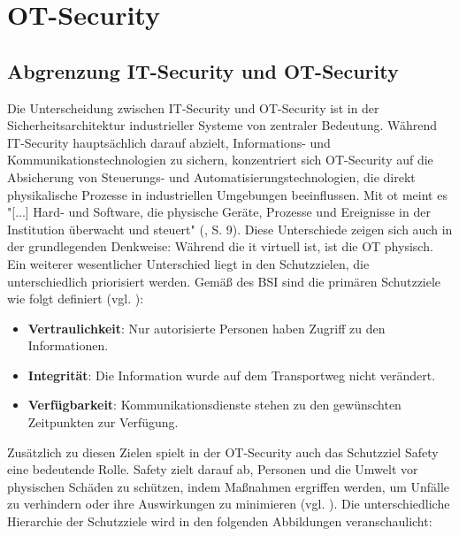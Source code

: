 \section{OT-Security}

\subsection{Abgrenzung IT-Security und OT-Security}

Die Unterscheidung zwischen IT-Security und OT-Security ist in der Sicherheitsarchitektur industrieller Systeme von zentraler Bedeutung. Während IT-Security hauptsächlich darauf abzielt, Informations- und Kommunikationstechnologien zu sichern, konzentriert sich OT-Security auf die Absicherung von Steuerungs- und Automatisierungstechnologien, die direkt physikalische Prozesse in industriellen Umgebungen beeinflussen. Mit \ac{ot} meint es "[...] Hard- und Software, die physische Geräte, Prozesse und Ereignisse in der Institution überwacht und steuert" (\cite {ICS}, S. 9). Diese Unterschiede zeigen sich auch in der grundlegenden Denkweise: Während die \ac{it} virtuell ist, ist die OT physisch. Ein weiterer wesentlicher Unterschied liegt in den Schutzzielen, die unterschiedlich priorisiert werden. Gemäß des BSI sind die primären Schutzziele wie folgt definiert (vgl. \cite{BSI}): 
\begin{itemize}
\item \textbf{Vertraulichkeit}: Nur autorisierte Personen haben Zugriff zu den Informationen.
\item \textbf{Integrität}: Die Information wurde auf dem Transportweg nicht verändert.
\item \textbf{Verfügbarkeit}: Kommunikationsdienste stehen zu den gewünschten Zeitpunkten zur Verfügung.
\end{itemize}
Zusätzlich zu diesen Zielen spielt in der OT-Security auch das Schutzziel Safety eine bedeutende Rolle. Safety zielt darauf ab, Personen und die Umwelt vor physischen Schäden zu schützen, indem Maßnahmen ergriffen werden, um Unfälle zu verhindern oder ihre Auswirkungen zu minimieren (vgl. \cite{Safety}). Die unterschiedliche Hierarchie der Schutzziele wird in den folgenden Abbildungen veranschaulicht:
